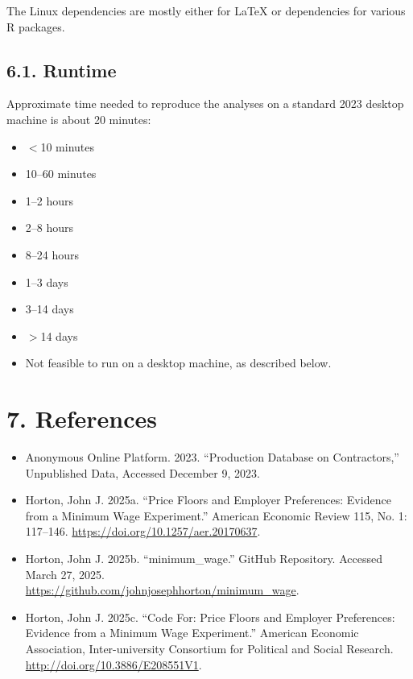 \documentclass[10pt]{article}
\begin{document}
The Linux dependencies are mostly either for LaTeX or dependencies for various R packages.

\subsection*{6.1. Runtime}

Approximate time needed to reproduce the analyses on a standard 2023 desktop machine is about 20 minutes:
\begin{itemize}[label=]
  \item $<$10 minutes
  \item [\ding{51}] 10--60 minutes
  \item 1--2 hours
  \item 2--8 hours
  \item 8--24 hours
  \item 1--3 days
  \item 3--14 days
  \item $>$14 days
  \item Not feasible to run on a desktop machine, as described below.
\end{itemize}

\vspace{1em}
\section*{7. References}

\begin{itemize}
  \item Anonymous Online Platform. 2023. ``Production Database on Contractors,'' Unpublished Data, Accessed December 9, 2023.
  \item Horton, John J. 2025a. ``Price Floors and Employer Preferences: Evidence from a Minimum Wage Experiment.'' American Economic Review 115, No. 1: 117--146. \href{https://doi.org/10.1257/aer.20170637}{https://doi.org/10.1257/aer.20170637}.
  \item Horton, John J. 2025b. ``minimum\_wage.'' GitHub Repository. Accessed March 27, 2025. \\ \href{https://github.com/johnjosephhorton/minimum_wage}{https://github.com/johnjosephhorton/minimum\_wage}.
  \item Horton, John J. 2025c. ``Code For: Price Floors and Employer Preferences: Evidence from a Minimum Wage Experiment.'' American Economic Association, Inter-university Consortium for Political and Social Research. \\ \href{http://doi.org/10.3886/E208551V1}{http://doi.org/10.3886/E208551V1}.
\end{itemize}
\end{document}
